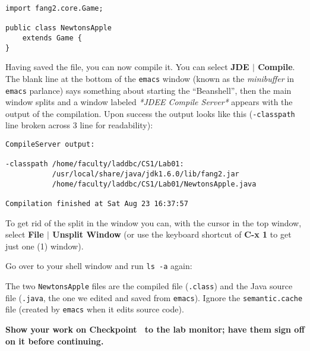 \documentclass[12pt,twoside]{memoir}
\begin{document}
\begin{Exercise}[name={Checkpoint},title={Starting and stopping \texttt{emacs}}]
\begin{lstlisting}
import fang2.core.Game;

public class NewtonsApple
    extends Game {
}
\end{lstlisting}

Having saved the file, you can now compile it. You can select
\textbf{JDE $|$ Compile}. The blank line at the bottom of the
\texttt{emacs} window (known as the \emph{minibuffer} in
\texttt{emacs} parlance) says something about starting the
``Beanshell'', then the main window splits and a window labeled
\emph{*JDEE Compile Server*} appears with the output of the
compilation. Upon success the output looks like this
(\texttt{-classpath} line broken across 3 line for readability):

\begin{lstlisting}[numbers=none]
CompileServer output:

-classpath /home/faculty/laddbc/CS1/Lab01:
           /usr/local/share/java/jdk1.6.0/lib/fang2.jar 
           /home/faculty/laddbc/CS1/Lab01/NewtonsApple.java

Compilation finished at Sat Aug 23 16:37:57
\end{lstlisting}

To get rid of the split in the window you can, with the cursor in the
top window, select \textbf{File $|$ Unsplit Window} (or use the
keyboard shortcut of \textbf{C-x 1} to get just one (1) window). 

Go over to your shell window and run \texttt{ls -a} again:


\noindent
The two \texttt{NewtonsApple} files are the compiled file
(\texttt{.class}) and the Java source file (\texttt{.java}, the one we
edited and saved from \texttt{emacs}). Ignore the \texttt{semantic.cache}
file (created by \texttt{emacs} when it edits source
code). 
\end{Exercise}
\noindent
\textbf{Show your work on Checkpoint~\theExercise{} to the lab monitor;
  have them sign off on it before continuing.}
\end{document}
